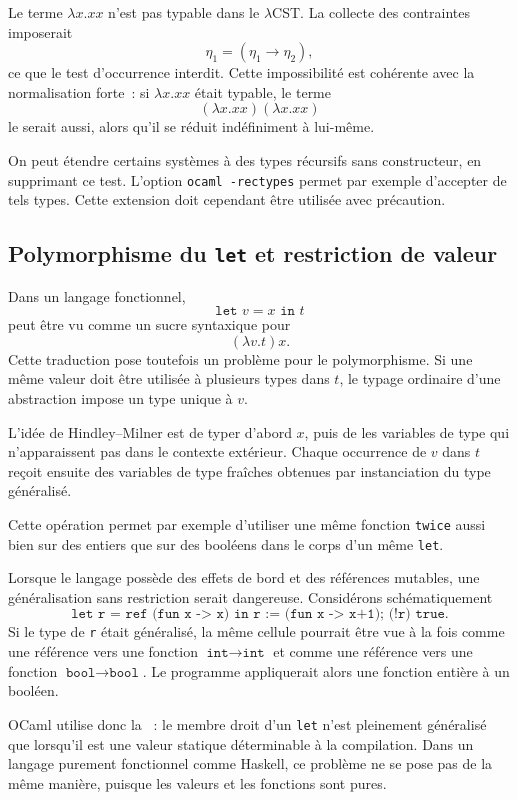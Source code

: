 \thingy Le terme $\lambda x.xx$ n'est pas typable dans le
$\lambda$CST. La collecte des contraintes imposerait
\[
\eta_1=(\eta_1\to\eta_2),
\]
ce que le test d'occurrence interdit. Cette impossibilité est cohérente
avec la normalisation forte : si $\lambda x.xx$ était typable, le terme
\[
(\lambda x.xx)(\lambda x.xx)
\]
le serait aussi, alors qu'il se réduit indéfiniment à lui-même.

On peut étendre certains systèmes à des types récursifs sans
constructeur, en supprimant ce test. L'option
\texttt{ocaml -rectypes} permet par exemple d'accepter de tels types.
Cette extension doit cependant être utilisée avec précaution.

\subsection{Polymorphisme du \texttt{let} et restriction de valeur}

\thingy Dans un langage fonctionnel,
\[
\texttt{let }v=x\texttt{ in }t
\]
peut être vu comme un sucre syntaxique pour
\[
(\lambda v.t)x.
\]
Cette traduction pose toutefois un problème pour le polymorphisme. Si
une même valeur doit être utilisée à plusieurs types dans $t$, le
typage ordinaire d'une abstraction impose un type unique à $v$.

L'idée de Hindley--Milner est de typer d'abord $x$, puis de
 les variables de type qui n'apparaissent pas dans
le contexte extérieur. Chaque occurrence de $v$ dans $t$ reçoit
ensuite des variables de type fraîches obtenues par instanciation du
type généralisé.

Cette opération permet par exemple d'utiliser une même fonction
\texttt{twice} aussi bien sur des entiers que sur des booléens dans le
corps d'un même \texttt{let}.

\thingy Lorsque le langage possède des effets de bord et des références
mutables, une généralisation sans restriction serait dangereuse.
Considérons schématiquement
\[
\texttt{let r = ref (fun x -> x) in
  r := (fun x -> x+1); (!r) true}.
\]
Si le type de \texttt{r} était généralisé, la même cellule pourrait être
vue à la fois comme une référence vers une fonction
$\texttt{int}\to\texttt{int}$ et comme une référence vers une fonction
$\texttt{bool}\to\texttt{bool}$. Le programme appliquerait alors une
fonction entière à un booléen.

OCaml utilise donc la  : le membre droit
d'un \texttt{let} n'est pleinement généralisé que lorsqu'il est une
valeur statique déterminable à la compilation. Dans un langage
purement fonctionnel comme Haskell, ce problème ne se pose pas de la
même manière, puisque les valeurs et les fonctions sont pures.
